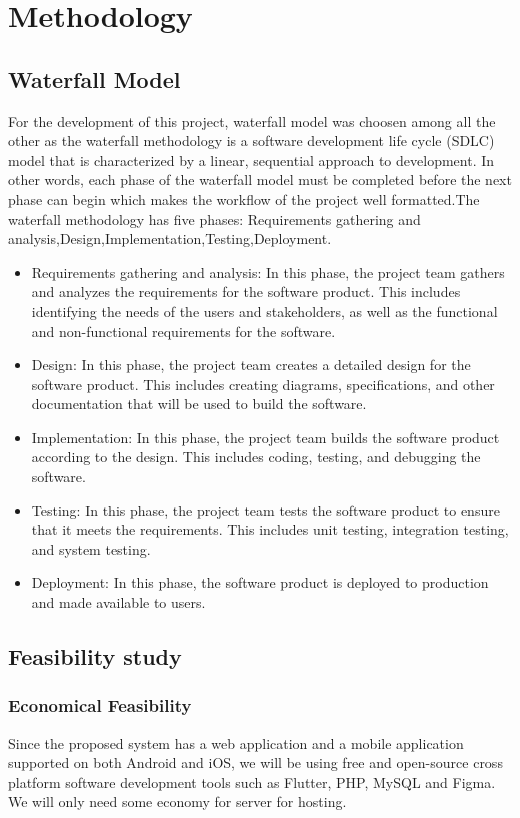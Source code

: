 \documentclass{article}
\begin{document}
\section{Methodology}
\subsection{Waterfall Model}
For the development of this project, waterfall model was choosen among all the other as the waterfall methodology is a software development life cycle (SDLC) model that is characterized by a linear, sequential approach to development. In other words, each phase of the waterfall model must be completed before the next phase can begin which makes the workflow of the project well formatted.The waterfall methodology has five phases:
Requirements gathering and analysis,Design,Implementation,Testing,Deployment.\\
\begin{itemize}
    \item Requirements gathering and analysis: In this phase, the project team gathers and analyzes the requirements for the software product. This includes identifying the needs of the users and stakeholders, as well as the functional and non-functional requirements for the software.
    \item Design: In this phase, the project team creates a detailed design for the software product. This includes creating diagrams, specifications, and other documentation that will be used to build the software.
    \item Implementation: In this phase, the project team builds the software product according to the design. This includes coding, testing, and debugging the software.
    \item Testing: In this phase, the project team tests the software product to ensure that it meets the requirements. This includes unit testing, integration testing, and system testing.
    \item Deployment: In this phase, the software product is deployed to production and made available to users.
\end{itemize}

\subsection{Feasibility study}
\subsubsection{Economical Feasibility}
Since the proposed system has a web application and a mobile application supported
on both Android and iOS, we will be using free and open-source cross platform
software development tools such as Flutter, PHP, MySQL and Figma. We will only need some economy for server for hosting.
\end{document}
